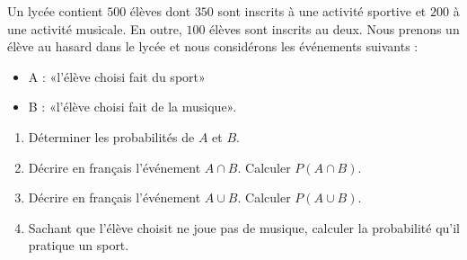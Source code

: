 
\begin{exercice}\label{exosmath-0709}

    Un lycée contient \( 500\) élèves dont \( 350\) sont inscrits à une activité sportive et \( 200\) à une activité musicale. En outre, \( 100\) élèves sont inscrits au deux. Nous prenons un élève au hasard dans le lycée et nous considérons les événements suivants :
    \begin{itemize}
        \item A : «l'élève choisi fait du sport» 
        \item B : «l'élève choisi fait de la musique».
    \end{itemize}
    \begin{enumerate}
        \item
            Déterminer les probabilités de \( A\) et \( B\).
        \item
            Décrire en français l'événement \( A\cap B\). Calculer \( P(A\cap B)\).
        \item
            Décrire en français l'événement \( A\cup B\). Calculer \( P(A\cup B)\).
        \item
            Sachant que l'élève choisit ne joue pas de musique, calculer la probabilité qu'il pratique un sport.
    \end{enumerate}

\end{exercice}

